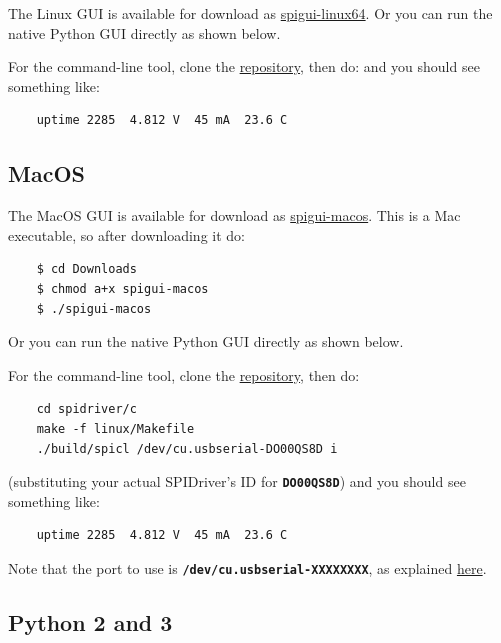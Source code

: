 \documentclass{article}
\newcommand{\mach}[1]{\texttt{\textbf{#1}}}
\begin{document}
The Linux GUI is available for download as
\href{https://github.com/jamesbowman/spidriver/releases/download/v0.1.0/spigui-linux64}{spigui-linux64}.
Or you can run the native Python GUI directly as shown below.

For the command-line tool, clone the
\href{https://github.com/jamesbowman/spidriver}{repository}, then do:
and you should see something like:

\begin{lstlisting}
    uptime 2285  4.812 V  45 mA  23.6 C
\end{lstlisting}

\subsection{MacOS}

The MacOS GUI is available for download as
\href{https://github.com/jamesbowman/spidriver/releases/download/v0.1.0/spigui-macos}{spigui-macos}.
This is a Mac executable, so after downloading it do:
\begin{lstlisting}
    $ cd Downloads
    $ chmod a+x spigui-macos
    $ ./spigui-macos
\end{lstlisting}

Or you can run the native Python GUI directly as shown below.

For the command-line tool, clone the
\href{https://github.com/jamesbowman/spidriver}{repository}, then do:

\begin{lstlisting}
    cd spidriver/c
    make -f linux/Makefile
    ./build/spicl /dev/cu.usbserial-DO00QS8D i
\end{lstlisting}

(substituting your actual SPIDriver's ID for \mach{DO00QS8D})
and you should see something like:
\begin{lstlisting}
    uptime 2285  4.812 V  45 mA  23.6 C
\end{lstlisting}

Note that the port to use is \mach{/dev/cu.usbserial-XXXXXXXX}, as explained
\href{https://pbxbook.com/other/mac-tty.html}{here}.

\subsection{Python 2 and 3}
\end{document}
